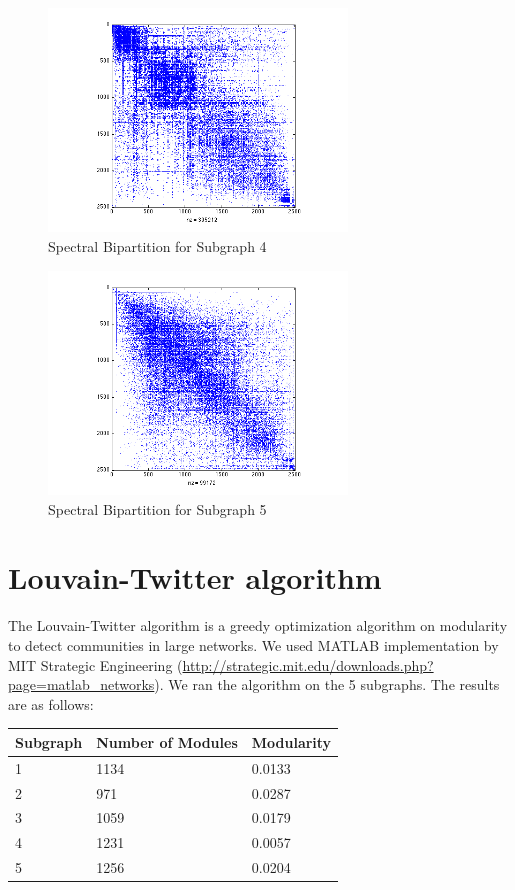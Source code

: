 \documentclass[11pt]{article}
\begin{document}
		 \begin{figure}
		 		\begin{center}
		  		\includegraphics[width=300px]{../graphs/spectral_partition_a4.png}
		  	\end{center}
		  	\caption{Spectral Bipartition for Subgraph 4}
		  	\label{fig:sb4}
		 \end{figure}
		 
		 \begin{figure}
		 		\begin{center}
		  		\includegraphics[width=300px]{../graphs/spectral_partition_a5.png}
		  	\end{center}
		  	\caption{Spectral Bipartition for Subgraph 5}
		  	\label{fig:sb5}
		 \end{figure}
		  

\section{Louvain-Twitter algorithm}
The Louvain-Twitter algorithm is a greedy optimization algorithm on modularity to detect communities in large networks. We used MATLAB implementation by MIT Strategic Engineering (\url{http://strategic.mit.edu/downloads.php?page=matlab_networks}). We ran the algorithm on the 5 subgraphs. The results are as follows:

\begin{table}[!htbp]
		\begin{tabular}{lll}
		Subgraph & Number of Modules & Modularity \\
	  \hline
		1 & 1134 & 0.0133 \\
		2 & 971 & 0.0287 \\
		3 & 1059 & 0.0179 \\
		4 & 1231 & 0.0057 \\
		5 & 1256 & 0.0204 \\
		\end{tabular}
\end{table}
\end{document}
